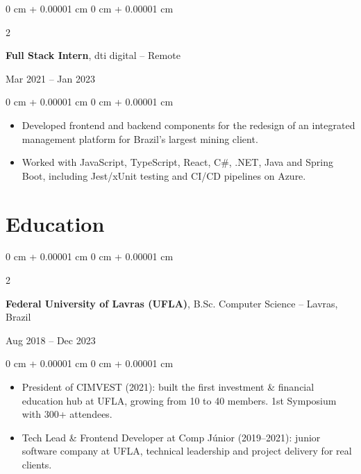 \documentclass[10pt, a4paper]{article}
\newenvironment{highlights}{
    \begin{itemize}[
        topsep=0.05 cm,
        parsep=0.05 cm,
        partopsep=0pt,
        itemsep=0pt,
        leftmargin=0 cm + 10pt
    ]
}{
    \end{itemize}
}
\newenvironment{onecolentry}{
    \begin{adjustwidth}{
        0 cm + 0.00001 cm
    }{
        0 cm + 0.00001 cm
    }
}{
    \end{adjustwidth}
}
\newenvironment{twocolentry}[2][]{
    \onecolentry
    \def\secondColumn{#2}
    \setcolumnwidth{\fill, 4.5 cm}
    \begin{paracol}{2}
}{
    \switchcolumn \raggedleft \secondColumn
    \end{paracol}
    \endonecolentry
}
\begin{document}
    \vspace{0.18 cm}

    \begin{twocolentry}{Mar 2021 -- Jan 2023}
        \textbf{Full Stack Intern}, dti digital -- Remote
    \end{twocolentry}
    \vspace{0.10 cm}
    \begin{onecolentry}
        \begin{highlights}
            \item Developed frontend and backend components for the redesign of an integrated management platform for Brazil's largest mining client.
            \item Worked with JavaScript, TypeScript, React, C\#, .NET, Java and Spring Boot, including Jest/xUnit testing and CI/CD pipelines on Azure.
        \end{highlights}
    \end{onecolentry}

    \section{Education}

    \begin{twocolentry}{Aug 2018 -- Dec 2023}
        \textbf{Federal University of Lavras (UFLA)}, B.Sc. Computer Science -- Lavras, Brazil
    \end{twocolentry}
    \vspace{0.10 cm}
    \begin{onecolentry}
        \begin{highlights}
            \item President of CIMVEST (2021): built the first investment \& financial education hub at UFLA, growing from 10 to 40 members. 1st Symposium with 300+ attendees.
            \item Tech Lead \& Frontend Developer at Comp Júnior (2019--2021): junior software company at UFLA, technical leadership and project delivery for real clients.
        \end{highlights}
    \end{onecolentry}

\end{document}

